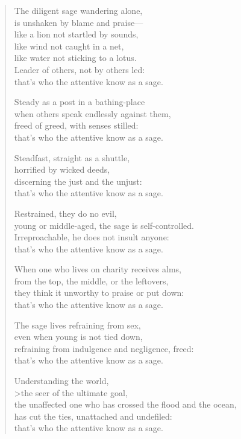 \documentclass[12pt,openany]{book}%
\begin{document}
\begin{verse}
The diligent sage wandering alone, \\
is unshaken by blame and praise—\\
like a lion not startled by sounds, \\
like wind not caught in a net, \\
like water not sticking to a lotus. \\
Leader of others, not by others led: \\
that’s who the attentive know as a sage. 

Steady as a post in a bathing-place \\
when others speak endlessly against them, \\
freed of greed, with senses stilled: \\
that’s who the attentive know as a sage. 

Steadfast, straight as a shuttle, \\
horrified by wicked deeds, \\
discerning the just and the unjust: \\
that’s who the attentive know as a sage. 

Restrained, they do no evil, \\
young or middle-aged, the sage is self-controlled. \\
Irreproachable, he does not insult anyone: \\
that’s who the attentive know as a sage. 

When one who lives on charity receives alms, \\
from the top, the middle, or the leftovers, \\
they think it unworthy to praise or put down: \\
that’s who the attentive know as a sage. 

The sage lives refraining from sex, \\
even when young is not tied down, \\
refraining from indulgence and negligence, freed: \\
that’s who the attentive know as a sage. 

Understanding the world, \\>the seer of the ultimate goal, \\
the unaffected one who has crossed the flood and the ocean, \\
has cut the ties, unattached and undefiled: \\
that’s who the attentive know as a sage. 


\end{verse}
\end{document}
